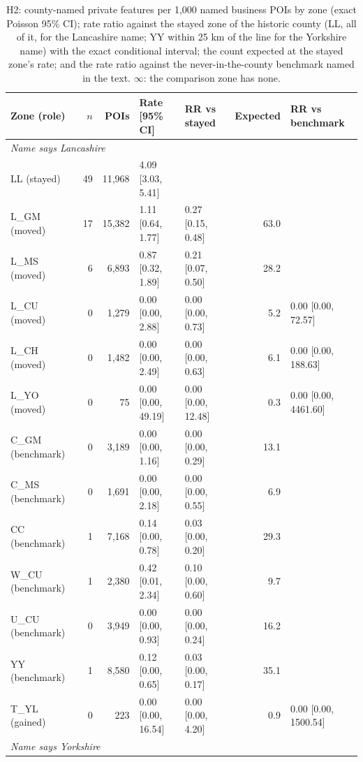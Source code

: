 \documentclass[11pt,a4paper]{article}
\begin{document}
\begin{table}[tbp]\centering\scriptsize\caption{H2: county-named private features per 1,000 named business POIs by zone (exact Poisson 95\% CI); rate ratio against the stayed zone of the historic county (LL, all of it, for the Lancashire name; YY within 25 km of the line for the Yorkshire name) with the exact conditional interval; the count expected at the stayed zone's rate; and the rate ratio against the never-in-the-county benchmark named in the text. $\infty$: the comparison zone has none.}\label{tab:rates}\setlength{\tabcolsep}{3pt}\begin{tabular}{lrrllrl}\toprule Zone (role) & $n$ & POIs & Rate [95\% CI] & RR vs stayed & Expected & RR vs benchmark\\\midrule
\multicolumn{7}{l}{\textit{Name says Lancashire}}\\
\quad LL (stayed) & 49 & 11,968 & 4.09 [3.03, 5.41] &  &  & \\
\quad L\_GM (moved) & 17 & 15,382 & 1.11 [0.64, 1.77] & 0.27 [0.15, 0.48] & 63.0 & \\
\quad L\_MS (moved) & 6 & 6,893 & 0.87 [0.32, 1.89] & 0.21 [0.07, 0.50] & 28.2 & \\
\quad L\_CU (moved) & 0 & 1,279 & 0.00 [0.00, 2.88] & 0.00 [0.00, 0.73] & 5.2 & 0.00 [0.00, 72.57]\\
\quad L\_CH (moved) & 0 & 1,482 & 0.00 [0.00, 2.49] & 0.00 [0.00, 0.63] & 6.1 & 0.00 [0.00, 188.63]\\
\quad L\_YO (moved) & 0 & 75 & 0.00 [0.00, 49.19] & 0.00 [0.00, 12.48] & 0.3 & 0.00 [0.00, 4461.60]\\
\quad C\_GM (benchmark) & 0 & 3,189 & 0.00 [0.00, 1.16] & 0.00 [0.00, 0.29] & 13.1 & \\
\quad C\_MS (benchmark) & 0 & 1,691 & 0.00 [0.00, 2.18] & 0.00 [0.00, 0.55] & 6.9 & \\
\quad CC (benchmark) & 1 & 7,168 & 0.14 [0.00, 0.78] & 0.03 [0.00, 0.20] & 29.3 & \\
\quad W\_CU (benchmark) & 1 & 2,380 & 0.42 [0.01, 2.34] & 0.10 [0.00, 0.60] & 9.7 & \\
\quad U\_CU (benchmark) & 0 & 3,949 & 0.00 [0.00, 0.93] & 0.00 [0.00, 0.24] & 16.2 & \\
\quad YY (benchmark) & 1 & 8,580 & 0.12 [0.00, 0.65] & 0.03 [0.00, 0.17] & 35.1 & \\
\quad T\_YL (gained) & 0 & 223 & 0.00 [0.00, 16.54] & 0.00 [0.00, 4.20] & 0.9 & 0.00 [0.00, 1500.54]\\
\multicolumn{7}{l}{\textit{Name says Yorkshire}}\\

\end{tabular}
\end{table}
\end{document}
